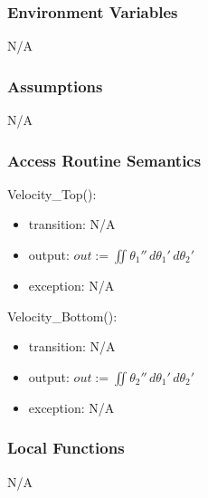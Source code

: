 \documentclass[12pt, titlepage]{article}
\begin{document}
\subsubsection{Environment Variables}
N/A
\subsubsection{Assumptions}
N/A
\subsubsection{Access Routine Semantics}

\noindent Velocity\_Top():
\begin{itemize}
\item transition: N/A 
\item output: $out:= $$\iint {\theta_1}'' \,d{\theta_1}'\,d{\theta_2}'$$ $
\item exception: N/A
\end{itemize}

\noindent Velocity\_Bottom():
\begin{itemize}
\item transition: N/A 
\item output: $out:= $$\iint {\theta_2}'' \,d{\theta_1}'\,d{\theta_2}'$$ $
\item exception: N/A
\end{itemize}

\subsubsection{Local Functions}

N/A
\newpage
\end{document}
